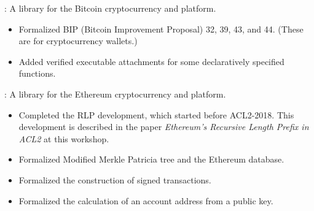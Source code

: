
\begin{frame}

\implibtitle

:
A library for the Bitcoin cryptocurrency and platform.
\begin{itemize}
\item
Formalized BIP (Bitcoin Improvement Proposal) 32, 39, 43, and 44.
(These are for cryptocurrency wallets.)
\item
Added verified executable attachments
for some declaratively specified functions.
\end{itemize}

\end{frame}


\begin{frame}

\implibtitle

:
A library for the Ethereum cryptocurrency and platform.
\begin{itemize}
\item
Completed the RLP development, which started before ACL2-2018.
This development is described in the paper
\textit{Ethereum's Recursive Length Prefix in ACL2} at this workshop.
\item
Formalized Modified Merkle Patricia tree and the Ethereum database.
\item
Formalized the construction of signed transactions.
\item
Formalized the calculation of an account address from a public key.
\end{itemize}

\end{frame}


